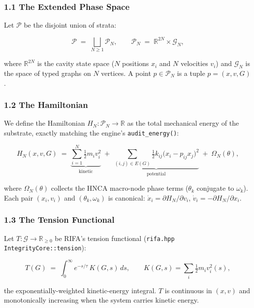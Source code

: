 \documentclass[
  11pt,
  a4paper,
]{article}
\begin{document}
\subsubsection{1.1 The Extended Phase
Space}\label{the-extended-phase-space}

Let \(\mathcal{P}\) be the disjoint union of strata:

\[
\mathcal{P} \;=\; \bigsqcup_{N \geq 1} \mathcal{P}_N, \qquad
\mathcal{P}_N \;=\; \mathbb{R}^{2N} \times \mathcal{G}_N,
\]

where \(\mathbb{R}^{2N}\) is the cavity state space (\(N\) positions
\(x_i\) and \(N\) velocities \(v_i\)) and \(\mathcal{G}_N\) is the space
of typed graphs on \(N\) vertices. A point \(p \in \mathcal{P}_N\) is a
tuple \(p = (x, v, G)\).

\subsubsection{1.2 The Hamiltonian}\label{the-hamiltonian}

We define the Hamiltonian \(H_N: \mathcal{P}_N \to \mathbb{R}\) as the
total mechanical energy of the substrate, exactly matching the engine's
\texttt{audit\_energy()}:

\[
H_N(x, v, G) \;=\; \underbrace{\sum_{i=1}^{N} \tfrac{1}{2} m_i v_i^2}_{\text{kinetic}}
                 \;+\; \underbrace{\sum_{(i,j) \in E(G)} \tfrac{1}{2} k_{ij} \big(x_i - p_{ij} x_j\big)^2}_{\text{potential}}
                 \;+\; \Omega_N(\theta),
\]

where \(\Omega_N(\theta)\) collects the HNCA macro-node phase terms
(\(\theta_k\) conjugate to \(\omega_k\)). Each pair \((x_i, v_i)\) and
\((\theta_k, \omega_k)\) is canonical:
\(\dot{x}_i = \partial H_N / \partial v_i\),
\(\dot{v}_i = -\partial H_N / \partial x_i\).

\subsubsection{1.3 The Tension Functional}\label{the-tension-functional}

Let \(T: \mathcal{G} \to \mathbb{R}_{\geq 0}\) be RIFA's tension
functional (\texttt{rifa.hpp} \texttt{IntegrityCore::tension}):

\[
T(G) \;=\; \int_0^\infty e^{-s/\tau} \, K(G, s) \, ds, \qquad K(G, s) = \sum_i \tfrac{1}{2} m_i v_i^2(s),
\]

the exponentially-weighted kinetic-energy integral. \(T\) is continuous
in \((x, v)\) and monotonically increasing when the system carries
kinetic energy.
\end{document}
